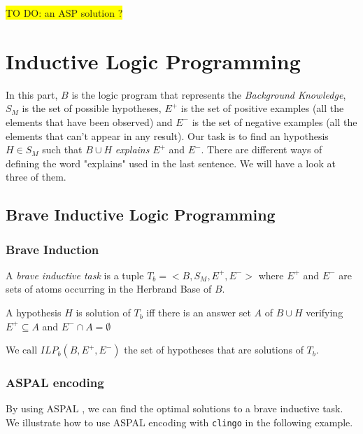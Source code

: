 \colorbox{yellow}{TO DO: an ASP solution ?}

\section{Inductive Logic Programming}

In this part, $B$ is the logic program that represents the \textit{Background Knowledge}, $S_M$ is the set of possible hypotheses, $E^+$ is the set of positive examples (all the elements that have been observed) and $E^-$ is the set of negative examples (all the elements that can't appear in any result). Our task is to find an hypothesis $H\in S_M$ such that $B\cup H$ \textit{explains} $E^+$ and $E^-$. There are different ways of defining the word "explains" used in the last sentence. We will have a look at three of them.


\subsection{Brave Inductive Logic Programming}

\subsubsection{Brave Induction}

\begin{definition}

A \textit{brave inductive task} is a tuple $T_b=<B, S_M, E^+, E^->$ where $E^+$ and $E^-$ are sets of atoms occurring in the Herbrand Base of $B$. 

\smallskip

A hypothesis $H$ is solution of $T_b$ iff there is an answer set $A$ of $B\cup H$ verifying $E^+\subseteq A$ and $E^-\cap A = \emptyset$

\smallskip

We call $ILP_b(B,E^+,E^-)$ the set of hypotheses that are solutions of $T_b$. 

\end{definition}

\subsubsection{ASPAL encoding}

By using ASPAL \citep{aspal}, we can find the optimal solutions to a brave inductive task. We illustrate how to use ASPAL encoding with \texttt{clingo} in the following example.\bigskip

